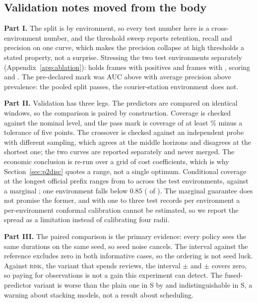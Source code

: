 \subsection*{Validation notes moved from the body}

\noindent\textbf{Part I.} The split is by environment, so every test number here is a cross-environment number, and
the threshold sweep reports retention, recall and precision on one curve, which makes the
precision collapse at high thresholds a stated property, not a surprise. Stressing the
two test environments separately (Appendix~\ref{app:ablation}): \texttt{\slotPEnvOneName}
holds \slotPEnvOneN{} frames with \slotPEnvOnePos{} positives and \texttt{\slotPEnvTwoName}
\slotPEnvTwoN{} frames with \slotPEnvTwoPos{}, scoring \slotPEnvOneAUC{} and
\slotPEnvTwoAUC{}. The pre-declared mark was AUC above \slotPassAUC{} with average precision
above prevalence: the pooled split passes, the courier-station environment does not.

\noindent\textbf{Part II.} Validation has three legs. The predictors are compared on identical windows, so
the comparison is paired by construction. Coverage is checked against the nominal
level, and the pass mark is coverage of at least \slotConfLevel{}\% minus a
tolerance of five points. The crossover is checked against an independent probe
with different sampling, which agrees at the middle horizons and disagrees at the
shortest one; the two curves are reported separately and never merged. The economic
conclusion is re-run over a grid of cost coefficients, which is why
Section~\ref{sec:p2disc} quotes a range, not a single optimum. Conditional coverage at the
longest official prefix ranges from \slotPConCovMin{} to \slotPConCovMax{} across the
\slotPConCovNEnv{} test environments, against a marginal \slotPConCovMarginal{}; one
environment falls below $0.85$ (\slotPConCovBelow{} of \slotPConCovNEnv{}). The marginal
guarantee does not promise the former, and with one to three test records per environment a
per-environment conformal calibration cannot be estimated, so we report the spread as a
limitation instead of calibrating four radii.

\noindent\textbf{Part III.} The paired comparison is the primary evidence: every policy sees the same durations on the
same seed, so seed noise cancels. The interval against the reference excludes zero in both
informative cases, so the ordering is not seed luck. Against \textsc{risk}, the variant that
spends reviews, the interval
\slotPStochPairSTwoRiskFusionDiff{}$\pm$\slotPStochPairSTwoRiskFusionCI{} and
\slotPStochPairSThreeRiskFusionDiff{}$\pm$\slotPStochPairSThreeRiskFusionCI{} covers zero,
so paying for observations is not a gain this experiment can detect. The fused-predictor
variant is worse than the plain one in S\slotCaseTwo{} by
\slotPStochPairSTwoSlackFusionDiff{} and indistinguishable in S\slotCaseThree, a warning
about stacking models, not a result about scheduling.

